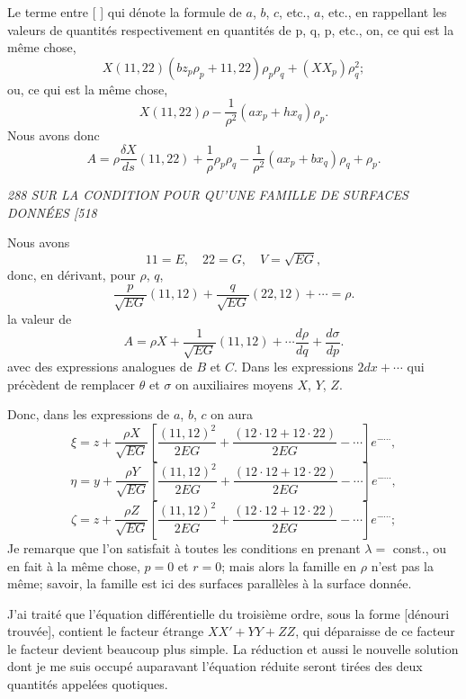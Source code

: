 \documentclass[11pt,a4paper]{book}
\begin{document}
Le terme entre [ ] qui d\'enote la formule de $a$, $b$, $c$, etc., $a$, etc., en rappellant
les valeurs de quantit\'es respectivement en quantit\'es de p, q, p, etc.,
on, ce qui est la m\^eme chose,
\[
X (11, 22)(b z_p \rho_p + 11, 22)\rho_p \rho_q + (XX_p)\rho_q^2;
\]
ou, ce qui est la m\^eme chose,
\[
X(11, 22)\rho - \frac{1}{\rho^2}(a x_p + h x_q)\rho_p.
\]
Nous avons donc
\[
A = \rho \frac{\delta X}{ds} (11, 22) + \frac{1}{\rho}\rho_p\rho_q - \frac{1}{\rho^2}(a x_p + b x_q)\rho_q + \rho_p.
\]

\clearpage

\noindent\textit{288 \hfill SUR LA CONDITION POUR QU'UNE FAMILLE DE SURFACES DONN\'EES \hfill [518}

\medskip

Nous avons
\[
11 = E, \quad 22 = G, \quad V = \sqrt{EG},
\]
donc, en d\'erivant, pour $\rho$, $q$,
\[
\frac{p}{\sqrt{EG}}(11, 12) + \frac{q}{\sqrt{EG}}(22, 12) + \cdots = \rho.
\]
la valeur de
\[
A = \rho X + \frac{1}{\sqrt{EG}}(11, 12) + \cdots \frac{d\rho}{dq} + \frac{d\sigma}{dp}.
\]
avec des expressions analogues de $B$ et $C$. Dans les expressions $2dx + \cdots$ qui pr\'ec\`edent
de remplacer $\theta$ et $\sigma$ on auxiliaires moyens $X$, $Y$, $Z$.

Donc, dans les expressions de $a$, $b$, $c$ on aura
\[
\xi = z + \frac{\rho X}{\sqrt{EG}}\left[\frac{(11, 12)^2}{2EG} + \frac{(12 \cdot 12 + 12 \cdot 22)}{2EG} - \cdots\right] e^{- \cdots},
\]
\[
\eta = y + \frac{\rho Y}{\sqrt{EG}}\left[\frac{(11, 12)^2}{2EG} + \frac{(12 \cdot 12 + 12 \cdot 22)}{2EG} - \cdots\right] e^{- \cdots},
\]
\[
\zeta = z + \frac{\rho Z}{\sqrt{EG}}\left[\frac{(11, 12)^2}{2EG} + \frac{(12 \cdot 12 + 12 \cdot 22)}{2EG} - \cdots\right] e^{- \cdots};
\]
Je remarque que l'on satisfait \`a toutes les conditions en prenant $\lambda = $ const., ou en
fait \`a la m\^eme chose, $p = 0$ et $r = 0$; mais alors la famille en $\rho$ n'est pas la m\^eme;
savoir, la famille est ici des surfaces parall\`eles \`a la surface donn\'ee.

\medskip

\quad [Pp.~1800---1803.]

\medskip

J'ai trait\'e que l'\'equation diff\'erentielle du troisi\`eme ordre, sous la forme [d\'enouri
trouv\'ee], contient le facteur \'etrange $XX' + YY + ZZ$, qui d\'eparaisse de ce facteur
le facteur devient beaucoup plus simple. La r\'eduction et aussi le nouvelle solution dont
je me suis occup\'e auparavant l'\'equation r\'eduite seront tir\'ees des deux quantit\'es appel\'ees
quotiques.
\end{document}
